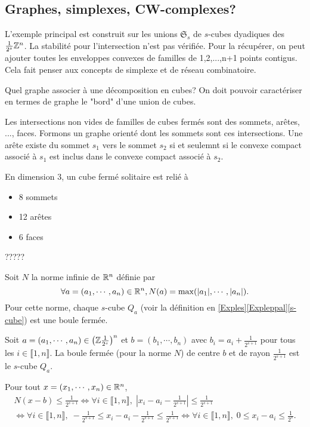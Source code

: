 \subsection{Graphes, simplexes, CW-complexes?}
L'exemple principal est construit sur les unions $\mathfrak{S}_s$ de $s$-cubes dyadiques des $\frac{1}{2^s}\mathbb{Z}^n$. La stabilité pour l'intersection n'est pas vérifiée. Pour la récupérer, on peut ajouter toutes les enveloppes convexes de familles de 1,2,...,n+1 points contigus. Cela fait penser aux concepts de simplexe et de réseau combinatoire.

Quel graphe associer à une décomposition en cubes?
On doit pouvoir caractériser en termes de graphe le "bord" d'une union de cubes.

Les intersections non vides de familles de cubes fermés sont des sommets, arêtes, ..., faces. Formons un graphe orienté dont les sommets sont ces intersections. Une arête existe du sommet $s_1$ vers le sommet $s_2$ si et seulemnt si le convexe compact associé à $s_1$ est inclus dans le convexe compact associé à $s_2$.

En dimension 3, un cube fermé solitaire est relié à
\begin{itemize}
 \item 8 sommets
 \item 12 arêtes
 \item 6 faces
\end{itemize}
?????

Soit $N$ la norme infinie de $\mathbb{R}^n$ définie par
\begin{displaymath}
 \forall a =(a_1, \cdots, a_n) \in \mathbb{R}^n, N(a) = \max(|a_1|, \cdots ,|a_n|).
\end{displaymath}
Pour cette norme, chaque $s$-cube $Q_a$ (voir la définition en \ref{Exples}\ref{Expleppal}\ref{s-cube}) est une boule fermée.
\begin{propn}
Soit $a =(a_1, \cdots, a_n) \in \left(\mathbb{Z}\frac{1}{2^s}\right)^n$ et $b=(b_1,\cdots,b_n)$ avec $b_i = a_i + \frac{1}{2^{s+1}}$ pour tous les $i\in \llbracket 1,n\rrbracket$.\newline
La boule fermée (pour la norme $N$) de centre $b$ et de rayon $\frac{1}{2^{s+1}}$ est le $s$-cube $Q_a$.
\end{propn}
\begin{demo}
 Pour tout $x =(x_1, \cdots, x_n) \in \mathbb{R}^n$,
\begin{multline*}
 N(x-b)\leq \frac{1}{2^{s+1}}
 \Leftrightarrow
 \forall i \in \llbracket 1, n\rrbracket, \; \left|x_i - a_i - \frac{1}{2^{s+1}} \right| \leq \frac{1}{2^{s+1}} \\
 \Leftrightarrow
 \forall i \in \llbracket 1, n\rrbracket, \; -\frac{1}{2^{s+1}} \leq x_i - a_i - \frac{1}{2^{s+1}} \leq \frac{1}{2^{s+1}}
 \Leftrightarrow
 \forall i \in \llbracket 1, n\rrbracket, \; 0 \leq x_i - a_i \leq \frac{1}{2^{s}}.
\end{multline*}
\end{demo}


